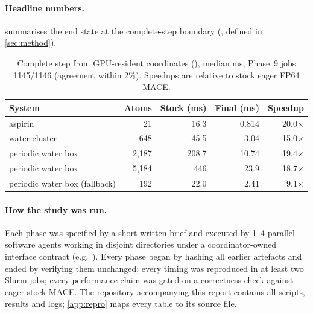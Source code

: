 \paragraph{Headline numbers.}  summarises the end state at the complete-step boundary (\Btwo, defined in \cref{sec:method}).

\begin{table}[h]
\centering
\caption{Complete step from GPU-resident coordinates (\Btwo), median ms, Phase~9 jobs 1145/1146 (agreement within 2\%). Speedups are relative to stock eager FP64 MACE.}
\label{tab:headline}
\begin{tabular}{lrrrr}
\toprule
System & Atoms & Stock (ms) & Final (ms) & Speedup \\
\midrule
aspirin & 21 & 16.3 & 0.814 & 20.0$\times$ \\
water cluster & 648 & 45.5 & 3.04 & 15.0$\times$ \\
periodic water box & 2{,}187 & 208.7 & 10.74 & 19.4$\times$ \\
periodic water box & 5{,}184 & 446 & 23.9 & 18.7$\times$ \\
periodic water box (fallback) & 192 & 22.0 & 2.41 & 9.1$\times$ \\
\bottomrule
\end{tabular}
\end{table}

\paragraph{How the study was run.} Each phase was specified by a short written brief and executed by 1--4 parallel software agents working in disjoint directories under a coordinator-owned interface contract (e.g.\ ). Every phase began by hashing all earlier artefacts and ended by verifying them unchanged; every timing was reproduced in at least two Slurm jobs; every performance claim was gated on a correctness check against eager stock MACE. The repository accompanying this report contains all scripts, results and logs; \cref{app:repro} maps every table to its source file.
